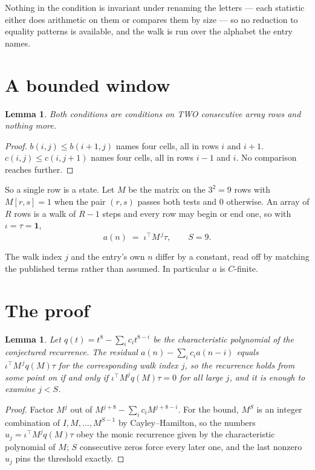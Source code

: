 \documentclass[11pt,a4paper]{article}
\theoremstyle{plain}
\newtheorem{lemma}[theorem]{Lemma}
\theoremstyle{definition}
\begin{document}
Nothing in the condition is invariant under renaming the letters --- each statistic either does
arithmetic on them or compares them by size --- so no reduction to equality patterns is
available, and the walk is run over the alphabet the entry names.

\section{A bounded window}

\begin{lemma}\label{lem:win}
Both conditions are conditions on TWO consecutive array rows and nothing more.
\end{lemma}

\begin{proof}
$b(i,j)\le b(i{+}1,j)$ names four cells, all in rows $i$ and $i+1$. $c(i,j)\le c(i,j{+}1)$
names four cells, all in rows $i-1$ and $i$. No comparison reaches further.
\end{proof}

So a single row is a state. Let $M$ be the matrix on the $3^{2}=9$ rows with
$M[r,s]=1$ when the pair $(r,s)$ passes both tests and $0$ otherwise. An array of $R$ rows is a
walk of $R-1$ steps and every row may begin or end one, so with $\iota=\tau=\mathbf{1}$,
\[
a(n)\;=\;\iota^{\!\top}M^{\,j}\tau ,\qquad S=9.
\]

The walk index $j$ and the entry's own $n$ differ by a constant, read off by matching the
published terms rather than assumed. In particular $a$ is $C$-finite.

\section{The proof}

\begin{lemma}\label{lem:crit}
Let $q(t)=t^{8}-\sum_i c_it^{8-i}$ be the characteristic polynomial of the
conjectured recurrence. The residual $a(n)-\sum_ic_ia(n-i)$ equals
$\iota^{\!\top}M^{\,j}q(M)\tau$ for the corresponding walk index $j$, so the recurrence
holds from some point on if and only if $\iota^{\!\top}M^{j}q(M)\tau=0$ for all large $j$,
and it is enough to examine $j<S$.
\end{lemma}

\begin{proof}
Factor $M^{j}$ out of $M^{j+8}-\sum_ic_iM^{j+8-i}$. For the bound, $M^{S}$
is an integer combination of $I,M,\dots,M^{S-1}$ by Cayley--Hamilton, so the numbers
$u_j=\iota^{\!\top}M^{j}q(M)\tau$ obey the monic recurrence given by the characteristic
polynomial of $M$; $S$ consecutive zeros force every later one, and the last nonzero $u_j$
pins the threshold exactly.
\end{proof}
\end{document}
